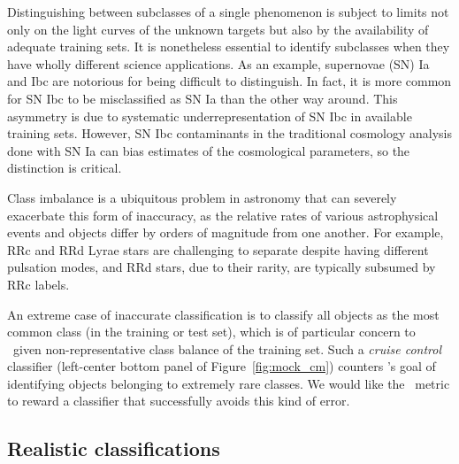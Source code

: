 Distinguishing between subclasses of a single phenomenon is subject to limits not only on the light curves of the unknown targets but also by the availability of adequate training sets.
It is nonetheless essential to identify subclasses when they have wholly different science applications.
As an example, supernovae (SN) Ia and Ibc are notorious for being difficult to distinguish.
In fact, it is more common for SN Ibc to be misclassified as SN Ia than the other way around.
This asymmetry is due to systematic underrepresentation of SN Ibc in available training sets.
However, SN Ibc contaminants in the traditional cosmology analysis done with SN Ia can bias estimates of the cosmological parameters, so the distinction is critical.

Class imbalance is a ubiquitous problem in astronomy that can severely exacerbate this form of inaccuracy, as the relative rates of various astrophysical events and objects differ by orders of magnitude from one another.
For example, RRc and RRd Lyrae stars are challenging to separate despite having different pulsation modes, and RRd stars, due to their rarity, are typically subsumed by RRc labels.

An extreme case of inaccurate classification is to classify all objects as the most common class (in the training or test set), which is of particular concern to \plasticc\ given non-representative class balance of the training set.
Such a \textit{cruise control} classifier (left-center bottom panel of Figure~\ref{fig:mock_cm}) counters \plasticc's goal of identifying objects belonging to extremely rare classes.
We would like the \plasticc\ metric to reward a classifier that successfully avoids this kind of error.

\subsection{Realistic classifications}
\label{sec:realdata}

